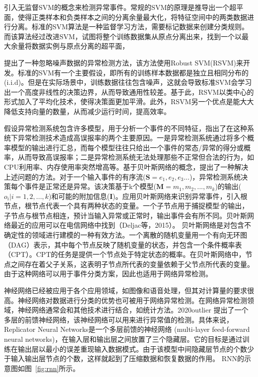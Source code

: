 \citet{2002AEskin} 引入无监督SVM的概念来检测异常事件。常规的SVM的原理是推导出一个超平面，使得正类样本和负类样本之间的分离余量最大化，将特征空间中的两类数据进行分离。标准的SVM算法是一种监督学习方法，需要标记数据来创建分类规则。而该算法经过改进SVM，试图将整个训练数据集从原点分离出来，找到一个以最大余量将数据实例与原点分离的超平面，

\citet{Hu2003Robust} 提出了一种忽略噪声数据的异常检测方法，该方法使用Robust SVM(RSVM)来开发。标准的SVM有一个主要假设，即所有的训练样本数据都是独立且相同分布的(i.i.d)。但是在实际场景中，训练数据往往包含噪声，这就会导致标准SVM会学习出一个高度非线性的决策边界，从而导致通用性较差。基于此，RSVM以类中心的形式加入了平均化技术，使得决策面更加平滑。此外，RSVM另一个优点是能大大降低支持向量的数量，从而减少运行时间，提高效率。

\citet{kruegel2003bayesian} 假设异常检测系统包含许多模型，用于分析一个事件的不同特征，指出了在这种系统下异常检测技术造成高误报率的两个主要原因。一是异常检测系统通过将多个概率模型的输出进行汇总，而每个模型往往只给出一个事件的常态/异常的得分或概率，从而导致高误报率；二是异常检测系统无法处理那些不正常但合法的行为，如CPU利用率、内存使用率突然增高等。基于贝叶斯网络的概念，\citet{kruegel2003bayesian}提出了一种解决上述问题的方法。对于一个输入事件的有序流($\symbf{S}=e_1,e_2,e_3...$)，异常检测系统决策每个事件是正常还是异常。该决策基于k个模型($\symbf{M}=m_1,m_2,...,m_k$)的输出($o_i|i=1,2,...,k$)和可能的附加信息($\symbf{I}$)。应用贝叶斯网络来识别异常事件，引入根节点，根节点代表一个具有两种状态的变量。一个子节点用于捕捉模型׳的输出，子节点与根节点相连，预计当输入异常或正常时，输出事件会有所不同。贝叶斯网络最近的应用可以在电信网络中找到（Deljac等，2015）。
贝叶斯网络是对包含不确定性的领域进行建模的一种有效方法。一个离散的随机变量用一个有向无环图（DAG）表示，其中每个节点反映了随机变量的状态，并包含一个条件概率表（CPT）。CPT的任务是提供一个节点处于特定状态的概率。在贝叶斯网络中，节点之间存在着父子关系，这表明子节点所代表的变量依赖于父节点所代表的变量。由于这种网络可以用于事件分类方案，因此也适用于网络异常检测。


神经网络已经被应用于各个应用领域，如图像和语音处理，但其对计算量的要求很高。神经网络对数据进行分类的优势也可被用于网络异常检测。在网络异常检测领域，神经网络通常会和其他技术进行结合，如统计方法。2020outlier 提出了一个多层的前馈神经网络，该神经网络可以用来进行异常值的检测。具体来说，Replicator Neural Networks是一个多层前馈的神经网络 (multi-layer feed-forward neural networks)，在输入层和输出层之间放置了三个隐藏层。它的目标是通过训练在输出层以最小的误差重现输入数据模式。由于该模型中间隐藏层节点的个数少于输入输出层节点的个数，这样就起到了压缩数据和恢复数据的作用。
RNN的示意图如图~\ref{fig:rnn}所示。

